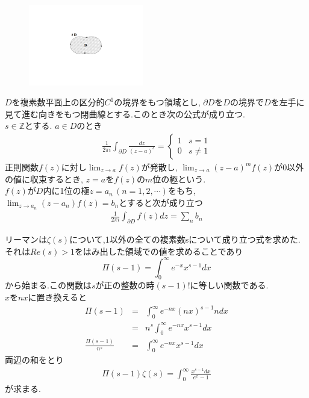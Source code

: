\begin{figure}
\vspace{-2\baselineskip}
\begin{center}
\includegraphics[width=50mm]{zetamura1.pdf}
\end{center}
\end{figure}
$D$を複素数平面上の区分的$C^1$の境界をもつ領域とし, $\partial D$を$D$の境界で$D$を左手に見て進む向きをもつ閉曲線とする.このとき次の公式が成り立つ.\\
$s\in \mathbb{Z}$とする. $a\in D$のとき
\begin{eqnarray*}
\frac{1}{2\pi i}\int_{\partial D} \frac{dz}{(z-a)^s} = \begin{cases}
1 & s=1 \\ 
0 & s\neq1
\end{cases}
\end{eqnarray*}
正則関数$f(z)$に対し$\displaystyle{\lim_{z\to a}f(z)}$が発散し, $\displaystyle{\lim_{z\to a}(z-a)^m f(z)}$が0以外の値に収束するとき, $z=a$を$f(z)$の$m$位の極という.\\
$f(z)$が$D$内に1位の極$z=a_n\,(n=1,2,\cdots)$をもち, $\displaystyle{\lim_{z\to a_n}(z-a_n)f(z)}=b_n$とすると次が成り立つ
\begin{eqnarray*}
\frac{1}{2\pi i}\int_{\partial D} f(z)dz = \sum_n b_n
\end{eqnarray*}

リーマンは$\zeta(s)$について,1以外の全ての複素数sについて成り立つ式を求めた.\\
それは$Re(s)>1$をはみ出した領域での値を求めることであり
\[
\Pi(s-1)=\int_0^\infty e^{-x}x^{s-1}dx
\]
から始まる.この関数は$s$が正の整数の時$(s-1)!$に等しい関数である.\\
$x$を$nx$に置き換えると
\begin{eqnarray*}
\Pi(s-1) &=& \int_0^\infty e^{-nx}(nx)^{s-1}ndx\\
&=& n^s \int_0^\infty e^{-nx}x^{s-1}dx\\
\frac{\Pi(s-1)}{n^s} &=& \int_0^\infty e^{-nx}x^{s-1}dx
\end{eqnarray*}
両辺の和をとり
\begin{align}
\Pi(s-1)\zeta(s)=\int_0^\infty \frac{x^{s-1}dx}{e^x-1}\label{eq:1}
\end{align}
が求まる.\\


